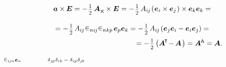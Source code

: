 \begin{otherlanguage}{russian}
\nopagebreak\vspace{-0.1em}\[\begin{array}{c}
\bm{a} \times\hspace{-0.1ex} \bm{E} = - \hspace{.2ex} \smalldisplaystyleonehalf \hspace{.4ex} \bm{A}_{\Xcompanion} \times \bm{E} = - \hspace{.2ex} \smalldisplaystyleonehalf \, A_{i\hspace{-0.1ex}j} \hspace{-0.2ex}
\left( \hspace{.08ex} \tikzmark{beginFirstCrossProduct} {\bm{e}_i \times \bm{e}_j} \tikzmark{endFirstCrossProduct} \hspace{.16ex} \right)
\times \bm{e}_k \bm{e}_k = \\[1.5em]
%
= - \hspace{.2ex} \smalldisplaystyleonehalf \hspace{.32ex} A_{i\hspace{-0.1ex}j} \hspace{.12ex}
\tikzmark{beginTwoLeviCivitas} \levicivita_{ni\hspace{-0.1ex}j} \levicivita_{nkp} \tikzmark{endTwoLeviCivitas}
\hspace{.32ex} \bm{e}_p \bm{e}_k = - \hspace{.2ex} \smalldisplaystyleonehalf \hspace{.32ex} A_{i\hspace{-0.1ex}j} \hspace{-0.1ex} \left( \bm{e}_j \bm{e}_i - \bm{e}_i \bm{e}_j \right) = \\[.8em]
%
\hspace{13.2em}= - \hspace{.2ex} \smalldisplaystyleonehalf \left({ \bm{A}^{\hspace{-0.1em}\T} \hspace{-0.25ex} - \hspace{-0.2ex} \bm{A} \hspace{.2ex}}\right) = \bm{A}^{\mathsf{\hspace{-0.1ex}A}} = \bm{A}.
\end{array}\]
%
{${\scriptstyle \levicivita_{i\hspace{-0.1ex}jn} \bm{e}_n}$}
%
{${\scriptstyle \hspace{3.2em}\delta_{j\hspace{-0.1ex}p} \delta_{ik} \,-\; \delta_{ip} \delta_{j\hspace{-0.1ex}k}}$}


\end{otherlanguage}
